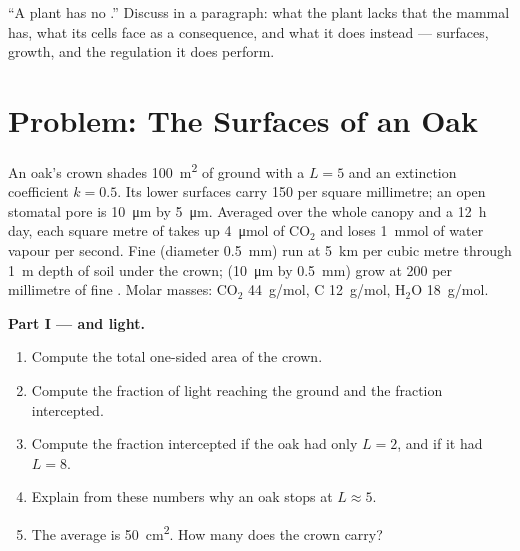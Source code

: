 \begin{exercise}[$\star\star\star$]\label{exo:b1:flowering-plant-organization:12}
``A plant has no .'' Discuss in a paragraph: what
the plant lacks that the mammal has, what its cells face as a
consequence, and what it does instead --- surfaces, growth, and the
regulation it does perform.
\end{exercise}

\section{Problem: The Surfaces of an Oak}

\begin{problem}
\label{pb:b1:flowering-plant-organization:1}
An oak's crown shades \qty{100}{m^2} of ground with a 
$L = 5$ and an extinction coefficient $k = 0.5$. Its lower 
surfaces carry \qty{150}{}  per square millimetre; an open
stomatal pore is \qty{10}{\micro m} by \qty{5}{\micro m}. Averaged over
the whole canopy and a \qty{12}{h} day, each square metre of  takes
up \qty{4}{\micro mol} of $\mathrm{CO_2}$ and loses \qty{1}{mmol} of
water vapour per second. Fine  (diameter \qty{0.5}{mm}) run at
\qty{5}{km} per cubic metre through \qty{1}{m} depth of soil under the
crown;  (\qty{10}{\micro m} by \qty{0.5}{mm}) grow at
\qty{200}{} per millimetre of fine . Molar masses:
$\mathrm{CO_2}$ \qty{44}{g/mol}, C \qty{12}{g/mol},
$\mathrm{H_2O}$ \qty{18}{g/mol}.

\medskip
\noindent\textbf{Part I ---  and light.}
\begin{enumerate}
  \item Compute the total one-sided  area of the crown.
  \item Compute the fraction of light reaching the ground and the
        fraction intercepted.
  \item Compute the fraction intercepted if the oak had only $L = 2$,
        and if it had $L = 8$.
  \item Explain from these numbers why an oak stops at $L \approx 5$.
  \item The average  is \qty{50}{cm^2}. How many  does the
        crown carry?
\end{enumerate}


\end{problem}
